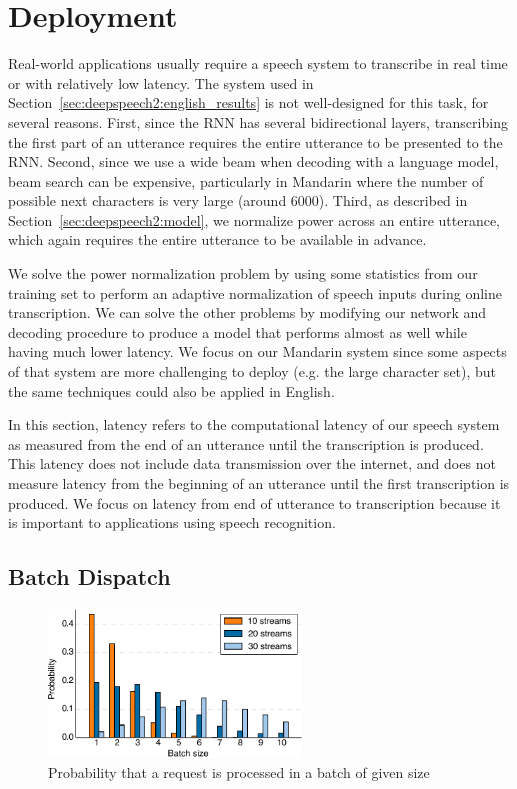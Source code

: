 \section{Deployment}
\label{sec:deepspeech2:deployment}

Real-world applications usually require a speech system to transcribe in real
time or with relatively low latency. The system used in
Section~\ref{sec:deepspeech2:english_results} is not well-designed for this
task, for several reasons. First, since the RNN has several bidirectional
layers, transcribing the first part of an utterance requires the entire
utterance to be presented to the RNN. Second, since we use a wide beam when
decoding with a language model, beam search can be expensive, particularly in
Mandarin where the number of possible next characters is very large (around
6000). Third, as described in Section~\ref{sec:deepspeech2:model}, we normalize
power across an entire utterance, which again requires the entire utterance to
be available in advance.

We solve the power normalization problem by using some statistics from our
training set to perform an adaptive normalization of speech inputs during
online transcription. We can solve the other problems by modifying our network
and decoding procedure to produce a model that performs almost as well while
having much lower latency. We focus on our Mandarin system since some aspects
of that system are more challenging to deploy (e.g. the large character set),
but the same techniques could also be applied in English.

In this section, latency refers to the computational latency of our speech
system as measured from the end of an utterance until the transcription is
produced. This latency does not include data transmission over the internet,
and does not measure latency from the beginning of an utterance until the first
transcription is produced. We focus on latency from end of utterance to
transcription because it is important to applications using speech recognition.

\subsection{Batch Dispatch}

\begin{figure}
\centering
\includegraphics[width=0.6\textwidth]{deepspeech2/figures/batching.pdf}
\caption{Probability that a request is processed in a batch of given size}
\label{fig:deepspeech2:batching}
\end{figure}

